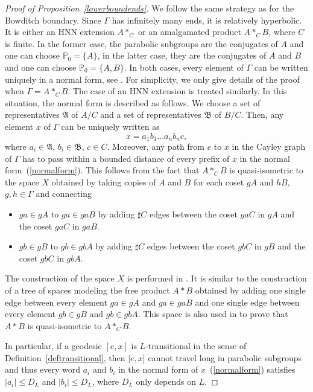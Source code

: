 \documentclass{amsart}
\theoremstyle{definition}
\theoremstyle{remark}
\begin{document}
\begin{proof}[Proof of Proposition~\ref{lowerboundends}]
We follow the same strategy as for the Bowditch boundary.
Since $\Gamma$ has infinitely many ends, it is relatively hyperbolic.
It is either an HNN extension $A*_{C}$ or an amalgamated product $A*_{C}B$, where $C$ is finite.
In the former case, the parabolic subgroups are the conjugates of $A$ and one can choose $\mathbb P_0=  \{A\}$, in the latter case, they are the conjugates of $A$ and $B$ and one can choose $\mathbb P_0=\{A,B\}$.
In both cases, every element of $\Gamma$ can be written uniquely in a normal form, see \cite[(9.2),(9.4)]{Woessends}.
For simplicity, we only give details of the proof when $\Gamma=A*_{C}B$.
The case of an HNN extension is treated similarly.
In this situation, the normal form is described as follows.
We choose a set of representatives $\mathfrak{A}$ of $A/C$ and a set of representatives $\mathfrak{B}$ of $B/C$.
Then, any element $x$ of $\Gamma$ can be uniquely written as
\begin{equation}\label{normalform}
x=a_1b_1...a_nb_nc,
\end{equation}
where $a_i\in \mathfrak{A}$, $b_i\in \mathfrak{B}$, $c\in C$.
Moreover, any path from $e$ to $x$ in the Cayley graph of $\Gamma$ has to pass within a bounded distance of every prefix of $x$ in the normal form~(\ref{normalform}).
This follows from the fact that $A*_CB$ is quasi-isometric to the space $X$ obtained by taking copies of $A$ and $B$ for each coset $gA$ and $hB$, $g,h\in \Gamma$ and connecting
\begin{itemize}
    \item $ga\in gA$ to $ga\in gaB$ by adding $\sharp C$ edges between the coset $gaC$ in $gA$ and the coset $gaC$ in $gaB$.
    \item $gb\in gB$ to $gb\in gbA$ by adding $\sharp C$ edges between the coset $gbC$ in $gB$ and the coset $gbC$ in $gbA$.
\end{itemize}
The construction of the space $X$ is performed in \cite{ScottWall}.
It is similar to the construction of a tree of spaces modeling the free product $A*B$ obtained by adding one single edge between every element $ga\in gA$ and $ga\in gaB$ and one single edge between every element $gb\in gB$ and $gb\in gbA$.
This space is also used in \cite{PapasogluWhyte} to prove that $A*B$ is quasi-isometric to $A*_CB$.

In particular, if a geodesic $[e,x]$ is $L$-transitional in the sense of Definition~\ref{deftransitional}, then $|e,x]$ cannot travel long in parabolic subgroups and thus every word $a_i$ and $b_i$ in the normal form of $x$~(\ref{normalform}) satisfies $|a_i|\leq D_L$ and $|b_i|\leq D_L$, where $D_L$ only depends on $L$.



\end{proof}
\end{document}
